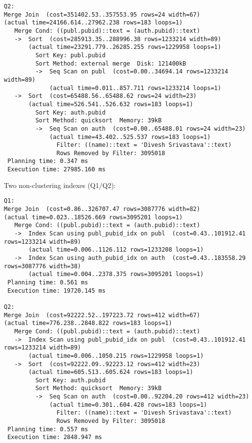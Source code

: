 \documentclass[11pt]{scrartcl}
\begin{document}
{\begin{verbatim}
Q2:
Merge Join  (cost=351402.53..357553.95 rows=24 width=67)
(actual time=24166.614..27962.238 rows=183 loops=1)
   Merge Cond: ((publ.pubid)::text = (auth.pubid)::text)
   ->  Sort  (cost=285913.35..288996.38 rows=1233214 width=89)
       (actual time=23291.779..26285.255 rows=1229958 loops=1)
         Sort Key: publ.pubid
         Sort Method: external merge  Disk: 121400kB
         ->  Seq Scan on publ  (cost=0.00..34694.14 rows=1233214 width=89)
             (actual time=0.011..857.711 rows=1233214 loops=1)
   ->  Sort  (cost=65488.56..65488.62 rows=24 width=23)
       (actual time=526.541..526.632 rows=183 loops=1)
         Sort Key: auth.pubid
         Sort Method: quicksort  Memory: 39kB
         ->  Seq Scan on auth  (cost=0.00..65488.01 rows=24 width=23)
             (actual time=43.402..525.537 rows=183 loops=1)
               Filter: ((name)::text = 'Divesh Srivastava'::text)
               Rows Removed by Filter: 3095018
 Planning time: 0.347 ms
 Execution time: 27985.160 ms
\end{verbatim}
}

\noindent Two non-clustering indexes (Q1/Q2):
{\small
\begin{verbatim}
Q1:
Merge Join  (cost=0.86..326707.47 rows=3087776 width=82)
(actual time=0.023..18526.669 rows=3095201 loops=1)
   Merge Cond: ((publ.pubid)::text = (auth.pubid)::text)
   ->  Index Scan using publ_pubid_idx on publ  (cost=0.43..101912.41 rows=1233214 width=89)
       (actual time=0.006..1126.112 rows=1233208 loops=1)
   ->  Index Scan using auth_pubid_idx on auth  (cost=0.43..183558.29 rows=3087776 width=38)
       (actual time=0.004..2378.375 rows=3095201 loops=1)
 Planning time: 0.561 ms
 Execution time: 19720.145 ms

Q2:
Merge Join  (cost=92222.52..197223.72 rows=412 width=67)
(actual time=776.238..2848.822 rows=183 loops=1)
   Merge Cond: ((publ.pubid)::text = (auth.pubid)::text)
   ->  Index Scan using publ_pubid_idx on publ  (cost=0.43..101912.41 rows=1233214 width=89)
       (actual time=0.006..1050.215 rows=1229958 loops=1)
   ->  Sort  (cost=92222.09..92223.12 rows=412 width=23)
       (actual time=605.513..605.624 rows=183 loops=1)
         Sort Key: auth.pubid
         Sort Method: quicksort  Memory: 39kB
         ->  Seq Scan on auth  (cost=0.00..92204.20 rows=412 width=23)
             (actual time=0.301..604.428 rows=183 loops=1)
               Filter: ((name)::text = 'Divesh Srivastava'::text)
               Rows Removed by Filter: 3095018
 Planning time: 0.557 ms
 Execution time: 2848.947 ms
\end{verbatim}
}
\end{document}
